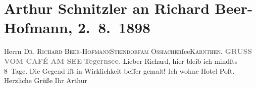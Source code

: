 

         
         \renewcommand{\erwaehntePersonen}{Personen: Richard Beer-Hofmann}
         \renewcommand{\erwaehnteOrte}{Orte: Café am See, Hotel Post, Kärnten, Ossiacher See, Steindorf am Ossiacher See, Tegernsee}
         \renewcommand{\erwaehnteWerke}{}
               \section[Arthur Schnitzler an Richard Beer-Hofmann, 2. 8. 1898]{ Arthur Schnitzler an Richard Beer-Hofmann, 2. 8. 1898}\nopagebreak{}\rehead{ }\begin{ledgroupsized}[t]{13cm}\normalsize\beginnumbering \toendnotes[C]{\smallbreak\pagebreak[2]} 
\toendnotes[C]{\smallbreak}\pstart{}{\pb}Herrn \textsc{Dr. Richard
                     Beer-Hofmann}\pend{}\pstart{}\textsc{Steindorf}\pend{}\pstart{}\textsc{am Ossiacher}ſee\pend{}\pstart{}\textsc{Kärnthen}.\pend{}{\bigskip}\pstart
           \noindent{}\centering{}{\pb}\textcolor{gray}{\textbf{GRUSS VOM CAFÉ AM
                        SEE}}\pend
           \pstart
           \noindent{}\centering{}\textcolor{gray}{\textbf{Tegernsee.}}\pend
           \pstart
           Lieber Richard, hier bleib ich mindſts
               8 Tage. Die Gegend iſt in Wirklichkeit beſſer gemalt! Ich wohne Hotel Poſt.\pend
           \pstart Herzliche Grüße Ihr \spacefill\mbox{Arthur}\pend{}
         
         \endnumbering{}\end{ledgroupsized}  \newcommand{\dateiname}{L00828}\newcommand{\titel}{Arthur Schnitzler an Richard Beer-Hofmann, 2. 8. 1898}\newcommand{\editorInnen}{Martin Anton Müller und Gerd-Hermann Susen}
      